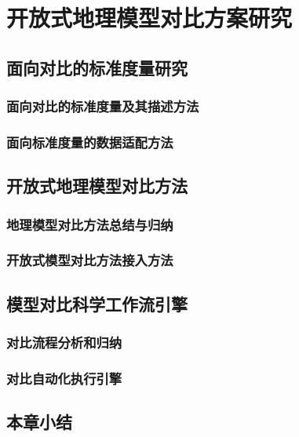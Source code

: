\chapter{开放式地理模型对比方案研究}

\section{面向对比的标准度量研究}
\subsection{面向对比的标准度量及其描述方法}
\subsection{面向标准度量的数据适配方法}

\section{开放式地理模型对比方法}
\subsection{地理模型对比方法总结与归纳}
\subsection{开放式模型对比方法接入方法}

\section{模型对比科学工作流引擎}
\subsection{对比流程分析和归纳}
\subsection{对比自动化执行引擎}

\section{本章小结}
